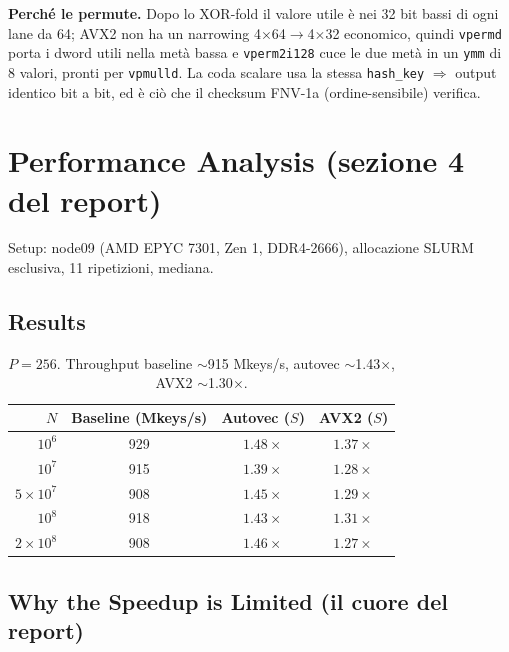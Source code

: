 \documentclass[11pt,a4paper]{article}
\begin{document}
\begin{difesa}
\textbf{Perché le permute.} Dopo lo XOR-fold il valore utile è nei 32 bit bassi di ogni lane da 64; AVX2 non ha un narrowing 4$\times$64$\to$4$\times$32 economico, quindi \texttt{vpermd} porta i dword utili nella metà bassa e \texttt{vperm2i128} cuce le due metà in un \texttt{ymm} di 8 valori, pronti per \texttt{vpmulld}. La coda scalare usa la stessa \texttt{hash\_key} $\Rightarrow$ output identico bit a bit, ed è ciò che il checksum FNV-1a (ordine-sensibile) verifica.
\end{difesa}

\section{Performance Analysis (sezione 4 del report)}

Setup: node09 (AMD EPYC 7301, Zen 1, DDR4-2666), allocazione SLURM esclusiva, 11 ripetizioni, mediana.

\subsection{Results}

\begin{table}[H]\centering\small
\begin{tabular}{@{}rccc@{}}\toprule
$N$ & Baseline (Mkeys/s) & Autovec ($S$) & AVX2 ($S$) \\\midrule
$10^6$ & 929 & $1.48\times$ & $1.37\times$ \\
$10^7$ & 915 & $1.39\times$ & $1.28\times$ \\
$5{\times}10^7$ & 908 & $1.45\times$ & $1.29\times$ \\
$10^8$ & 918 & $1.43\times$ & $1.31\times$ \\
$2{\times}10^8$ & 908 & $1.46\times$ & $1.27\times$ \\\bottomrule
\end{tabular}\caption{$P=256$. Throughput baseline $\sim$915 Mkeys/s, autovec $\sim$1.43$\times$, AVX2 $\sim$1.30$\times$.}
\end{table}

\subsection{Why the Speedup is Limited (il cuore del report)}
\end{document}
